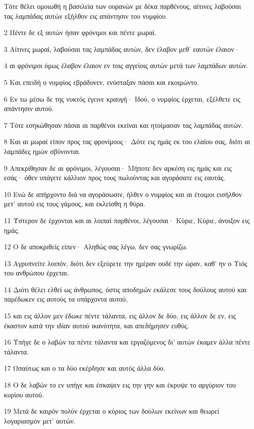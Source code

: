 \par Τότε θέλει ομοιωθή η βασιλεία των ουρανών με δέκα παρθένους, αίτινες λαβούσαι τας λαμπάδας αυτών εξήλθον εις απάντησιν του νυμφίου.
\par 2 Πέντε δε εξ αυτών ήσαν φρόνιμοι και πέντε μωραί.
\par 3 Αίτινες μωραί, λαβούσαι τας λαμπάδας αυτών, δεν έλαβον μεθ' εαυτών έλαιον·
\par 4 αι φρόνιμοι όμως έλαβον έλαιον εν τοις αγγείοις αυτών μετά των λαμπάδων αυτών.
\par 5 Και επειδή ο νυμφίος εβράδυνεν, ενύσταξαν πάσαι και εκοιμώντο.
\par 6 Εν τω μέσω δε της νυκτός έγεινε κραυγή· Ιδού, ο νυμφίος έρχεται, εξέλθετε εις απάντησιν αυτού.
\par 7 Τότε εσηκώθησαν πάσαι αι παρθένοι εκείναι και ητοίμασαν τας λαμπάδας αυτών.
\par 8 Και αι μωραί είπον προς τας φρονίμους· Δότε εις ημάς εκ του ελαίου σας, διότι αι λαμπάδες ημών σβύνονται.
\par 9 Απεκρίθησαν δε αι φρόνιμοι, λέγουσαι· Μήποτε δεν αρκέση εις ημάς και εις εσάς· όθεν υπάγετε κάλλιον προς τους πωλούντας και αγοράσατε εις εαυτάς.
\par 10 Ενώ δε απήρχοντο διά να αγοράσωσιν, ήλθεν ο νυμφίος και αι έτοιμοι εισήλθον μετ' αυτού εις τους γάμους, και εκλείσθη η θύρα.
\par 11 Ύστερον δε έρχονται και αι λοιπαί παρθένοι, λέγουσαι· Κύριε, Κύριε, άνοιξον εις ημάς.
\par 12 Ο δε αποκριθείς είπεν· Αληθώς σας λέγω, δεν σας γνωρίζω.
\par 13 Αγρυπνείτε λοιπόν, διότι δεν εξεύρετε την ημέραν ουδέ την ώραν, καθ' ην ο Υιός του ανθρώπου έρχεται.
\par 14 Διότι θέλει ελθεί ως άνθρωπος, όστις αποδημών εκάλεσε τους δούλους αυτού και παρέδωκεν εις αυτούς τα υπάρχοντα αυτού,
\par 15 και εις άλλον μεν έδωκε πέντε τάλαντα, εις άλλον δε δύο, εις άλλον δε εν, εις έκαστον κατά την ιδίαν αυτού ικανότητα, και απεδήμησεν ευθύς.
\par 16 Υπήγε δε ο λαβών τα πέντε τάλαντα και εργαζόμενος δι' αυτών έκαμεν άλλα πέντε τάλαντα.
\par 17 Ωσαύτως και ο τα δύο εκέρδησε και αυτός άλλα δύο.
\par 18 Ο δε λαβών το εν υπήγε και έσκαψεν εις την γην και έκρυψε το αργύριον του κυρίου αυτού.
\par 19 Μετά δε καιρόν πολύν έρχεται ο κύριος των δούλων εκείνων και θεωρεί λογαριασμόν μετ' αυτών.
